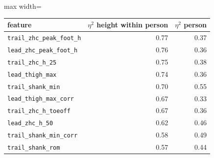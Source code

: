 \begin{adjustbox}{max width=\textwidth}
{\footnotesize
\begin{tabular}{lrr}
\toprule
\textbf{feature} & \textbf{$\eta^2$ height within person} & \textbf{$\eta^2$ person} \\
\midrule
\texttt{trail\_\allowbreak{}zhc\_\allowbreak{}peak\_\allowbreak{}foot\_\allowbreak{}h} & 0.77 & 0.37 \\
\texttt{lead\_\allowbreak{}zhc\_\allowbreak{}peak\_\allowbreak{}foot\_\allowbreak{}h} & 0.76 & 0.36 \\
\texttt{trail\_\allowbreak{}zhc\_\allowbreak{}h\_\allowbreak{}25} & 0.75 & 0.38 \\
\texttt{lead\_\allowbreak{}thigh\_\allowbreak{}max} & 0.74 & 0.36 \\
\texttt{trail\_\allowbreak{}shank\_\allowbreak{}min} & 0.70 & 0.55 \\
\texttt{lead\_\allowbreak{}thigh\_\allowbreak{}max\_\allowbreak{}corr} & 0.67 & 0.33 \\
\texttt{trail\_\allowbreak{}zhc\_\allowbreak{}h\_\allowbreak{}toeoff} & 0.67 & 0.36 \\
\texttt{lead\_\allowbreak{}zhc\_\allowbreak{}h\_\allowbreak{}50} & 0.62 & 0.46 \\
\texttt{trail\_\allowbreak{}shank\_\allowbreak{}min\_\allowbreak{}corr} & 0.58 & 0.49 \\
\texttt{trail\_\allowbreak{}shank\_\allowbreak{}rom} & 0.57 & 0.44 \\
\bottomrule
\end{tabular}
}
\end{adjustbox}
